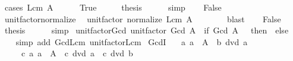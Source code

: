 \begin{isabellebody}
\isatagproof
{}\isamarkupfalse%
\ {\isacharparenleft}{\kern0pt}cases\ {\isachardoublequoteopen}Lcm\ A\ {\isacharequal}{\kern0pt}\ {}{\isachardoublequoteclose}{\isacharparenright}{\kern0pt}\isanewline
\ \ \isamarkupfalse%
\ True\isanewline
\ \ \isamarkupfalse%
\ \isamarkupfalse%
\ {\isacharquery}{\kern0pt}thesis\isanewline
\ \ \ \ \isamarkupfalse%
\ simp\isanewline
{}\isamarkupfalse%
\isanewline
\ \ \isamarkupfalse%
\ False\isanewline
\ \ \isamarkupfalse%
\ unit{\isacharunderscore}{\kern0pt}factor{\isacharunderscore}{\kern0pt}normalize\ \isamarkupfalse%
\ {\isachardoublequoteopen}unit{\isacharunderscore}{\kern0pt}factor\ {\isacharparenleft}{\kern0pt}normalize\ {\isacharparenleft}{\kern0pt}Lcm\ A{\isacharparenright}{\kern0pt}{\isacharparenright}{\kern0pt}\ {\isacharequal}{\kern0pt}\ {}{\isachardoublequoteclose}\isanewline
\ \ \ \ \isamarkupfalse%
\ blast\isanewline
\ \ \isamarkupfalse%
\ False\ \isamarkupfalse%
\ {\isacharquery}{\kern0pt}thesis\isanewline
\ \ \ \ \isamarkupfalse%
\ simp\isanewline
{}\isamarkupfalse%
%
\endisatagproof
{\isafoldproof}%
%
\isadelimproof
\isanewline
%
\endisadelimproof
\isanewline
{}\isamarkupfalse%
\ unit{\isacharunderscore}{\kern0pt}factor{\isacharunderscore}{\kern0pt}Gcd{\isacharcolon}{\kern0pt}\ {\isachardoublequoteopen}unit{\isacharunderscore}{\kern0pt}factor\ {\isacharparenleft}{\kern0pt}Gcd\ A{\isacharparenright}{\kern0pt}\ {\isacharequal}{\kern0pt}\ {\isacharparenleft}{\kern0pt}if\ Gcd\ A\ {\isacharequal}{\kern0pt}\ {}\ then\ {}\ else\ {}{\isacharparenright}{\kern0pt}{\isachardoublequoteclose}\isanewline
%
\isadelimproof
\ \ %
\endisadelimproof
%
\isatagproof
{}\isamarkupfalse%
\ {\isacharparenleft}{\kern0pt}simp\ add{\isacharcolon}{\kern0pt}\ Gcd{\isacharunderscore}{\kern0pt}Lcm\ unit{\isacharunderscore}{\kern0pt}factor{\isacharunderscore}{\kern0pt}Lcm{\isacharparenright}{\kern0pt}%
\endisatagproof
{\isafoldproof}%
%
\isadelimproof
\isanewline
%
\endisadelimproof
\isanewline
{}\isamarkupfalse%
\ GcdI{\isacharcolon}{\kern0pt}\isanewline
\ \ \ {\isachardoublequoteopen}{\isasymAnd}a{\isachardot}{\kern0pt}\ a\ {\isasymin}\ A\ {\isasymLongrightarrow}\ b\ dvd\ a{\isachardoublequoteclose}\isanewline
\ \ \ \ \ {\isachardoublequoteopen}{\isasymAnd}c{\isachardot}{\kern0pt}\ {\isacharparenleft}{\kern0pt}{\isasymAnd}a{\isachardot}{\kern0pt}\ a\ {\isasymin}\ A\ {\isasymLongrightarrow}\ c\ dvd\ a{\isacharparenright}{\kern0pt}\ {\isasymLongrightarrow}\ c\ dvd\ b{\isachardoublequoteclose}\isanewline

\end{isabellebody}
